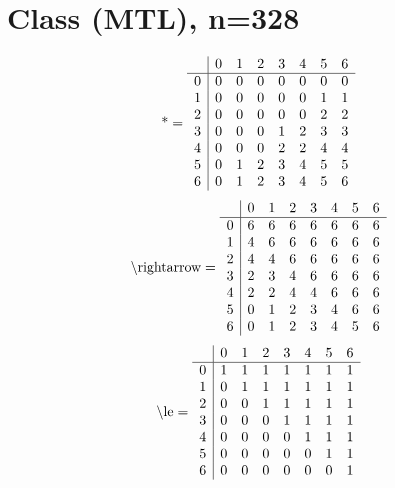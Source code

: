 \documentclass[11pt]{article}
\begin{document}
\section{Class (MTL), n=328}
\[\text{*} = 
\begin{array}{r | r r r r r r r}
 & 0 & 1 & 2 & 3 & 4 & 5 & 6 \\ \hline
0 & 0 & 0 & 0 & 0 & 0 & 0 & 0 \\
1 & 0 & 0 & 0 & 0 & 0 & 1 & 1 \\
2 & 0 & 0 & 0 & 0 & 0 & 2 & 2 \\
3 & 0 & 0 & 0 & 1 & 2 & 3 & 3 \\
4 & 0 & 0 & 0 & 2 & 2 & 4 & 4 \\
5 & 0 & 1 & 2 & 3 & 4 & 5 & 5 \\
6 & 0 & 1 & 2 & 3 & 4 & 5 & 6 \\
\end{array}
\]
\[\text{\textbackslash rightarrow} = 
\begin{array}{r | r r r r r r r}
 & 0 & 1 & 2 & 3 & 4 & 5 & 6 \\ \hline
0 & 6 & 6 & 6 & 6 & 6 & 6 & 6 \\
1 & 4 & 6 & 6 & 6 & 6 & 6 & 6 \\
2 & 4 & 4 & 6 & 6 & 6 & 6 & 6 \\
3 & 2 & 3 & 4 & 6 & 6 & 6 & 6 \\
4 & 2 & 2 & 4 & 4 & 6 & 6 & 6 \\
5 & 0 & 1 & 2 & 3 & 4 & 6 & 6 \\
6 & 0 & 1 & 2 & 3 & 4 & 5 & 6 \\
\end{array}
\]
\[\text{\textbackslash le} = 
\begin{array}{r | r r r r r r r}
 & 0 & 1 & 2 & 3 & 4 & 5 & 6 \\ \hline
0 & 1 & 1 & 1 & 1 & 1 & 1 & 1 \\
1 & 0 & 1 & 1 & 1 & 1 & 1 & 1 \\
2 & 0 & 0 & 1 & 1 & 1 & 1 & 1 \\
3 & 0 & 0 & 0 & 1 & 1 & 1 & 1 \\
4 & 0 & 0 & 0 & 0 & 1 & 1 & 1 \\
5 & 0 & 0 & 0 & 0 & 0 & 1 & 1 \\
6 & 0 & 0 & 0 & 0 & 0 & 0 & 1 \\
\end{array}
\]
\end{document}
